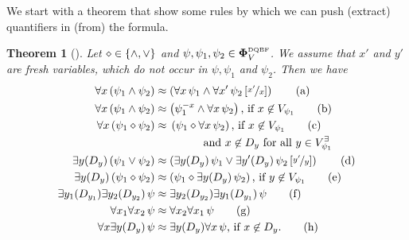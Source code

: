 \documentclass[
  digital, %
  color,
  twoside, %
  table,   %
  nolof,     %
  nolot,     %
]{fithesis3}
\let\setbuilder\set
\newcommand{\simpleset}[1]{\{{#1}\}}
\renewcommand{\set}[1]{\normalexpandarg\IfSubStr{#1}{|}{\setbuilder{#1}}{\simpleset{#1}}}
\newtheorem{theorem}{Theorem}[chapter] %
\theoremstyle{definition}
\theoremstyle{remark}
\newcommand{\substitute}[2]{\left[ \nicefrac{#2}{#1} \right]}
\newcommand{\DQBF}[1]{\mathbf{\Phi}_{#1}^{\normalfont{\text{\tiny DQBF}}}}
\newcommand{\evars}[1]{V_{#1}^{\exists}}
\newcommand{\itholds}{\,}
\begin{document}
We start with a theorem that show some rules by which we can push (extract) quantifiers in (from) the formula. 

\begin{theorem}[{\cite[Theorems 3,4]{HQSquantifierLocalisation}}]
\label{thrm:quantLocalEq}
  Let ${\diamond} \in \set{{\land},{\lor}}$ and $\psi,\psi_1,\psi_2 \in \DQBF{V}$. We assume that $x'$ and $y'$ are fresh variables, which do not occur in $\psi,\psi_1$ and $\psi_2$. Then we have
  \begin{align}
      \forall x \itholds (\psi_1 \land \psi_2) &\approx \left(\forall x \itholds \psi_1 \land \forall x' \itholds \psi_2\substitute{x}{x'}\right) \tag{a} \label{loc:unconj1} \\
      \forall x \itholds (\psi_1 \land \psi_2) &\approx \left(\psi_1^{-x} \land \forall x \itholds \psi_2\right) \text{, if } x \not\in V_{\psi_1} \tag{b} \label{loc:unconj2} \\
      \forall x \itholds (\psi_1 \diamond \psi_2) &\approx \begin{multlined}[t][3cm]\left(\psi_1 \diamond \forall x \itholds \psi_2\right) \text{, if } x \not\in V_{\psi_1} \tag{c} \label{loc:undisj} \\
      \text{ and } x \not\in D_y \text{ for all } y \in \evars{\psi_1}\end{multlined} \\
      \exists y(D_y) \itholds (\psi_1 \lor \psi_2) &\approx \left(\exists y(D_y) \itholds \psi_1 \lor \exists y'(D_y) \itholds \psi_2\substitute{y}{y'}\right) \tag{d} \label{loc:exdisj} \\
      \exists y(D_y) \itholds (\psi_1 \diamond \psi_2) &\approx \left(\psi_1 \diamond \exists y(D_y) \itholds \psi_2\right) \text{, if } y \not\in V_{\psi_1} \tag{e} \label{loc:exboth} \\
      \exists y_1(D_{y_1})\exists y_2(D_{y_2}) \itholds \psi &\approx \exists y_2(D_{y_2}) \exists y_1(D_{y_1}) \itholds \psi \tag{f} \label{loc:exswap} \\
      \forall x_1\forall x_2 \itholds \psi &\approx \forall x_2\forall x_1 \itholds \psi \tag{g} \label{loc:unswap} \\
      \forall x\exists y(D_y) \itholds \psi &\approx \exists y(D_y)\forall x \itholds \psi\text{, if } x \not\in D_y. \tag{h} \label{loc:bothswap}
  \end{align}
\end{theorem}
\end{document}
